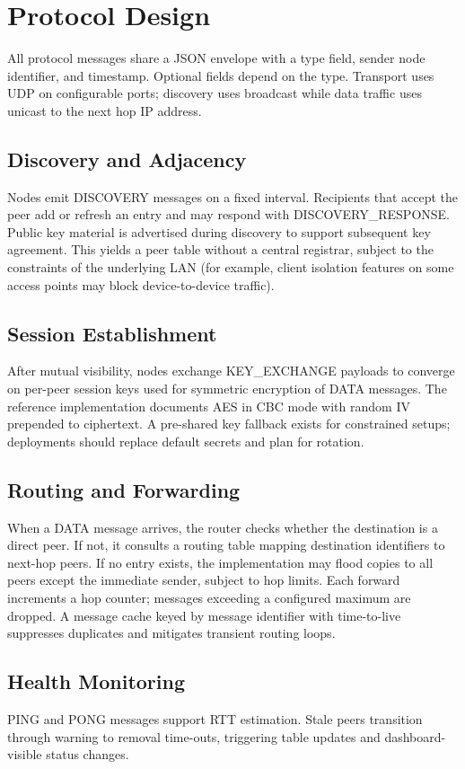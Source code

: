 \documentclass[conference]{IEEEtran}
\begin{document}
\section{Protocol Design}
All protocol messages share a JSON envelope with a type field, sender node identifier, and timestamp. Optional fields depend on the type. Transport uses UDP on configurable ports; discovery uses broadcast while data traffic uses unicast to the next hop IP address.

\subsection{Discovery and Adjacency}
Nodes emit DISCOVERY messages on a fixed interval. Recipients that accept the peer add or refresh an entry and may respond with DISCOVERY\_RESPONSE. Public key material is advertised during discovery to support subsequent key agreement. This yields a peer table without a central registrar, subject to the constraints of the underlying LAN (for example, client isolation features on some access points may block device-to-device traffic).

\subsection{Session Establishment}
After mutual visibility, nodes exchange KEY\_EXCHANGE payloads to converge on per-peer session keys used for symmetric encryption of DATA messages. The reference implementation documents AES in CBC mode with random IV prepended to ciphertext. A pre-shared key fallback exists for constrained setups; deployments should replace default secrets and plan for rotation.

\subsection{Routing and Forwarding}
When a DATA message arrives, the router checks whether the destination is a direct peer. If not, it consults a routing table mapping destination identifiers to next-hop peers. If no entry exists, the implementation may flood copies to all peers except the immediate sender, subject to hop limits. Each forward increments a hop counter; messages exceeding a configured maximum are dropped. A message cache keyed by message identifier with time-to-live suppresses duplicates and mitigates transient routing loops.

\subsection{Health Monitoring}
PING and PONG messages support RTT estimation. Stale peers transition through warning to removal time-outs, triggering table updates and dashboard-visible status changes.
\end{document}
